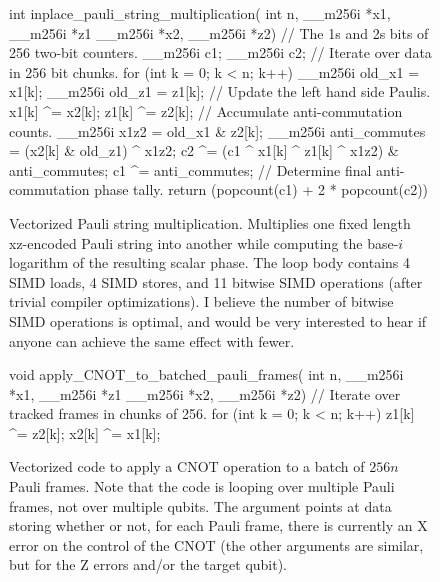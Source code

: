 \documentclass[onecolumn,unpublished]{quantumarticle}
\theoremstyle{definition}
\theoremstyle{definition}
\theoremstyle{definition}
\begin{document}
\begin{figure}
    \centering
\begin{cpp}
    int inplace_pauli_string_multiplication(
            int n, __m256i *x1, __m256i *z1 __m256i *x2, __m256i *z2) {
        // The 1s and 2s bits of 256 two-bit counters.
        __m256i c1{};
        __m256i c2{};
        // Iterate over data in 256 bit chunks.
        for (int k = 0; k < n; k++) {
            __m256i old_x1 = x1[k];
            __m256i old_z1 = z1[k];
            // Update the left hand side Paulis.
            x1[k] ^= x2[k];
            z1[k] ^= z2[k];
            // Accumulate anti-commutation counts.
            __m256i x1z2 = old_x1 & z2[k];
            __m256i anti_commutes = (x2[k] & old_z1) ^ x1z2;
            c2 ^= (c1 ^ x1[k] ^ z1[k] ^ x1z2) & anti_commutes;
            c1 ^= anti_commutes;
        }
        // Determine final anti-commutation phase tally.
        return (popcount(c1) + 2 * popcount(c2)) %
    }
\end{cpp}
    \caption{
        Vectorized Pauli string multiplication.
        Multiplies one fixed length xz-encoded Pauli string into another while computing the base-$i$ logarithm of the resulting scalar phase.
        The loop body contains 4 SIMD loads, 4 SIMD stores, and 11 bitwise SIMD operations (after trivial compiler optimizations).
        I believe the number of bitwise SIMD operations is optimal, and would be very interested to hear if anyone can achieve the same effect with fewer.
    }
    \label{fig:pauli_mult_code}
\end{figure}

\begin{figure}
    \centering
\begin{cpp}
    void apply_CNOT_to_batched_pauli_frames(
            int n, __m256i *x1, __m256i *z1 __m256i *x2, __m256i *z2) {
        // Iterate over tracked frames in chunks of 256.
        for (int k = 0; k < n; k++) {
            z1[k] ^= z2[k];
            x2[k] ^= x1[k];
        }
    }
\end{cpp}
    \caption{
        Vectorized code to apply a CNOT operation to a batch of $256n$ Pauli frames.
        Note that the code is looping over multiple Pauli frames, not over multiple qubits.
        The argument \protect{} points at data storing whether or not, for each Pauli frame, there is currently an X error on the control of the CNOT (the other arguments are similar, but for the Z errors and/or the target qubit).
    }
    \label{fig:pauli_frame_code}
\end{figure}
\end{document}
